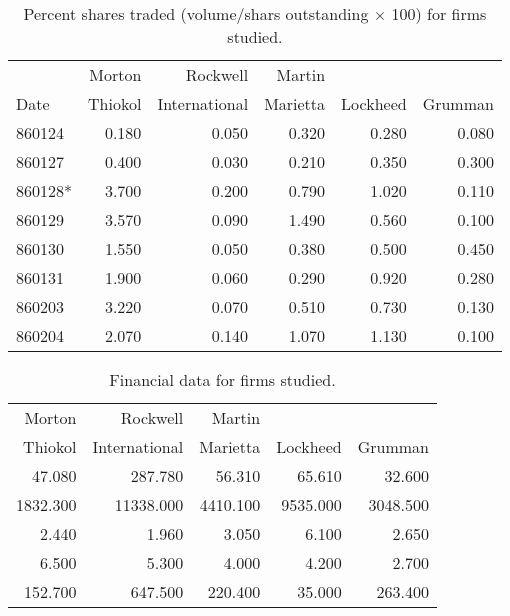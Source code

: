 \begin{table}[hp]
\caption{Percent shares traded (volume/shars outstanding
$\times$ 100) for firms studied.}
\begin{tabular*}{6in}{lrrrrr}
\hline\hline       
       &  Morton & Rockwell & Martin &          &         \\
Date   &  Thiokol & International & Marietta & Lockheed & Grumman \\
\hline
860124 &   0.180 &   0.050 &   0.320 &   0.280 &   0.080  \\
860127 &   0.400 &   0.030 &   0.210 &   0.350 &   0.300  \\
860128* &   3.700 &   0.200 &   0.790 &   1.020 &   0.110  \\
860129 &   3.570 &   0.090 &   1.490 &   0.560 &   0.100  \\
860130 &   1.550 &   0.050 &   0.380 &   0.500 &   0.450  \\
860131 &   1.900 &   0.060 &   0.290 &   0.920 &   0.280  \\
860203 &   3.220 &   0.070 &   0.510 &   0.730 &   0.130  \\
860204 &   2.070 &   0.140 &   1.070 &   1.130 &   0.100  \\ \hline
\end{tabular*}
\end{table}


\begin{table}[hp]
\caption{Financial data for firms studied.}
\begin{tabular*}{6in}{rrrrr}
\hline\hline       
 Morton & Rockwell & Martin &          &         \\
 Thiokol & International & Marietta & Lockheed & Grumman \\
\hline
47.080 & 287.780 &  56.310 &  65.610 &  32.600 \\
1832.300 & 11338.000 & 4410.100 & 9535.000 & 3048.500 \\
2.440 &   1.960 &   3.050 &   6.100 &   2.650 \\
6.500 &   5.300 &   4.000 &   4.200 &   2.700  \\
152.700 & 647.500 & 220.400 &  35.000 & 263.400 \\ \hline
\end{tabular*}
\end{table}

